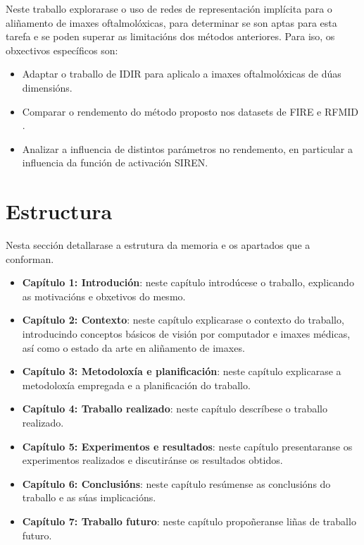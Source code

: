 Neste traballo explorarase o uso de redes de representación implícita para o aliñamento de imaxes oftalmolóxicas, para determinar se son aptas para esta tarefa e se poden superar as limitacións dos métodos anteriores.
Para iso, os obxectivos específicos son:
\begin{itemize}
    \item Adaptar o traballo de IDIR \cite{wolterink2021implicit} para aplicalo a imaxes oftalmolóxicas de dúas dimensións.
    \item Comparar o rendemento do método proposto nos datasets de FIRE \cite{FIRE} e RFMID \cite{RFMiD}.
    \item Analizar a influencia de distintos parámetros no rendemento, en particular a influencia da función de activación SIREN.
\end{itemize}

\section{Estructura }

Nesta sección detallarase a estrutura da memoria e os apartados que a conforman.

\begin{itemize}
    \item \textbf{Capítulo 1: Introdución}: neste capítulo introdúcese o traballo, explicando as motivacións e obxetivos do mesmo.
    \item \textbf{Capítulo 2: Contexto}: neste capítulo explicarase o contexto do traballo, introducindo conceptos básicos de visión por computador e imaxes médicas, así como o estado da arte en aliñamento de imaxes.
    \item \textbf{Capítulo 3: Metodoloxía e planificación}: neste capítulo explicarase a metodoloxía empregada e a planificación do traballo.
    \item \textbf{Capítulo 4: Traballo realizado}: neste capítulo descríbese o traballo realizado.
    \item \textbf{Capítulo 5: Experimentos e resultados}: neste capítulo presentaranse os experimentos realizados e discutiránse os resultados obtidos. 
    \item \textbf{Capítulo 6: Conclusións}: neste capítulo resúmense as conclusións do traballo e as súas implicacións.
    \item \textbf{Capítulo 7: Traballo futuro}: neste capítulo propoñeranse liñas de traballo futuro.
\end{itemize}
